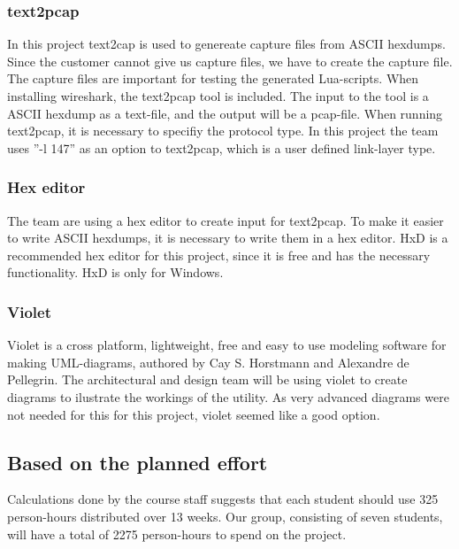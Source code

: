 \subsubsection{text2pcap}
In this project text2cap is used to genereate capture files from ASCII hexdumps. Since the customer cannot give us capture files, we have to create the capture file. The capture files are important for testing the generated Lua-scripts.  When installing wireshark, the text2pcap tool is included. The input to the tool is a ASCII hexdump as a text-file, and the output will be a pcap-file. When running text2pcap, it is necessary to specifiy the protocol type. In this project the team uses ''-l 147'' as an option to text2pcap, which is a user defined link-layer type.

\subsubsection{Hex editor}
The team are using a hex editor to create input for text2pcap. To make it easier to write ASCII hexdumps, it is necessary to write them in a hex editor. HxD is a recommended hex editor for this project, since it is free and has the necessary functionality. HxD is only for Windows.

\subsubsection{Violet}
Violet is a cross platform, lightweight, free and easy to use modeling software for making UML-diagrams, authored by Cay S. Horstmann and Alexandre de Pellegrin. The architectural and design team will be using violet to create diagrams to ilustrate the workings of the utility. As very advanced diagrams were not needed for this for this project, violet seemed like a good option.  

\subsection{Based on the planned effort}
Calculations done by the course staff suggests that each student should use 325 person-hours distributed over 13 weeks. Our group, consisting of seven students, will have a total of 2275 person-hours to spend on the project. 

